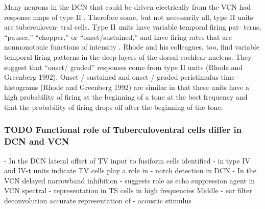  Many neurons in the DCN that could be driven electrically
 from the VCN had response maps of type II \citep{Young:1980}.
Therefore
 some, but not necessarily all, type II units are tuberculoven-
 tral cells. Type II units have variable temporal firing pat-
 terns, “pauser,” “chopper,” or “onset/sustained,”
 and have firing rates that are nonmonotonic
 functions of intensity \citep{ShofnerYoung:1985}. Rhode and his colleagues,
 too, find variable temporal firing patterns in the deep layers
 of the dorsal cochlear nucleus. They suggest that “onset/
 graded” responses come from type II units (Rhode and
 Greenberg 1992). Onset / sustained \citep{ShofnerYoung:1985} and onset / graded peristimulus
 time histograms (Rhode and Greenberg 1992) are similar in that these units
 have a high probability of firing at the beginning of a tone at
 the best frequency and that the probability of firing drops
 off after the beginning of the tone.



\subsubsection{TODO Functional role of Tuberculoventral cells differ in DCN and VCN}

                     - In the DCN lateral offset of TV input to fusiform cells identified
  - in \EIRA type IV and IV-t units indicate TV cells play a role in
  - notch detection in DCN 
 - In the VCN delayed narrowband inhibition
  - suggests role as echo suppression agent in VCN spectral
  - representation in TS cells in high frequencies \rightarrow Middle
  - ear filter deconvolution \rightarrow accurate representation of
  - acoustic stimulus








